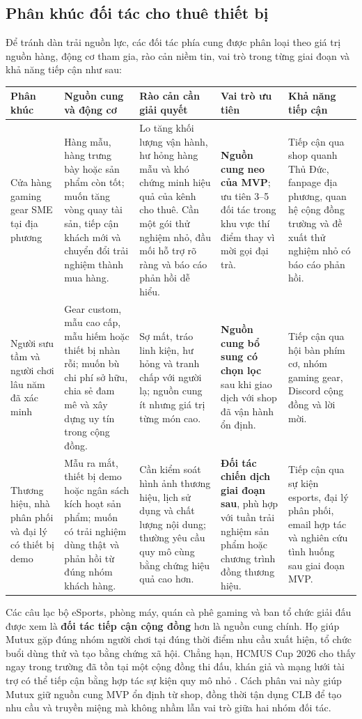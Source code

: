 \subsection{Phân khúc đối tác cho thuê thiết bị}

Để tránh dàn trải nguồn lực, các đối tác phía cung được phân loại theo giá trị nguồn hàng, động cơ tham gia, rào cản niềm tin, vai trò trong từng giai đoạn và khả năng tiếp cận như sau:

\begin{longtable}{@{}p{}p{}p{}p{}p{}@{}}
\toprule
\textbf{Phân khúc} & \textbf{Nguồn cung và động cơ} & \textbf{Rào cản cần giải quyết} & \textbf{Vai trò ưu tiên} & \textbf{Khả năng tiếp cận} \\
\midrule
\endhead
Cửa hàng gaming gear SME tại địa phương & Hàng mẫu, hàng trưng bày hoặc sản phẩm còn tốt; muốn tăng vòng quay tài sản, tiếp cận khách mới và chuyển đổi trải nghiệm thành mua hàng. & Lo tăng khối lượng vận hành, hư hỏng hàng mẫu và khó chứng minh hiệu quả của kênh cho thuê. Cần một gói thử nghiệm nhỏ, đầu mối hỗ trợ rõ ràng và báo cáo phản hồi dễ hiểu. & \textbf{Nguồn cung neo của MVP}; ưu tiên 3--5 đối tác trong khu vực thí điểm thay vì mời gọi đại trà. & Tiếp cận qua shop quanh Thủ Đức, fanpage địa phương, quan hệ cộng đồng trường và đề xuất thử nghiệm nhỏ có báo cáo phản hồi. \\
Người sưu tầm và người chơi lâu năm đã xác minh & Gear custom, mẫu cao cấp, mẫu hiếm hoặc thiết bị nhàn rỗi; muốn bù chi phí sở hữu, chia sẻ đam mê và xây dựng uy tín trong cộng đồng. & Sợ mất, tráo linh kiện, hư hỏng và tranh chấp với người lạ; nguồn cung ít nhưng giá trị từng món cao. & \textbf{Nguồn cung bổ sung có chọn lọc} sau khi giao dịch với shop đã vận hành ổn định. & Tiếp cận qua hội bàn phím cơ, nhóm gaming gear, Discord cộng đồng và lời mời. \\
Thương hiệu, nhà phân phối và đại lý có thiết bị demo & Mẫu ra mắt, thiết bị demo hoặc ngân sách kích hoạt sản phẩm; muốn có trải nghiệm dùng thật và phản hồi từ đúng nhóm khách hàng. & Cần kiểm soát hình ảnh thương hiệu, lịch sử dụng và chất lượng nội dung; thường yêu cầu quy mô cùng bằng chứng hiệu quả cao hơn. & \textbf{Đối tác chiến dịch giai đoạn sau}, phù hợp với tuần trải nghiệm sản phẩm hoặc chương trình đồng thương hiệu. & Tiếp cận qua sự kiện esports, đại lý phân phối, email hợp tác và nghiên cứu tình huống sau giai đoạn MVP. \\
\bottomrule
\end{longtable}

Các câu lạc bộ eSports, phòng máy, quán cà phê gaming và ban tổ chức giải đấu được xem là \textbf{đối tác tiếp cận cộng đồng} hơn là nguồn cung chính. Họ giúp Mutux gặp đúng nhóm người chơi tại đúng thời điểm nhu cầu xuất hiện, tổ chức buổi dùng thử và tạo bằng chứng xã hội. Chẳng hạn, HCMUS Cup 2026 cho thấy ngay trong trường đã tồn tại một cộng đồng thi đấu, khán giả và mạng lưới tài trợ có thể tiếp cận bằng hợp tác sự kiện quy mô nhỏ \cite{vngHcmusCup2026}. Cách phân vai này giúp Mutux giữ nguồn cung MVP ổn định từ shop, đồng thời tận dụng CLB để tạo nhu cầu và truyền miệng mà không nhầm lẫn vai trò giữa hai nhóm đối tác.

